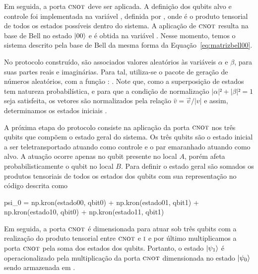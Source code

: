 Em seguida, a porta \(\operatorname{\textsc{cnot}}\) deve ser aplicada. A definição dos qubits alvo e controle foi implementada na variável , definida por , onde  é o produto tensorial de todos os estados possíveis dentro do sistema. A aplicação de \(\operatorname{\textsc{cnot}}\) resulta na base de Bell no estado $\ket{00}$ e é obtida na variável . Nesse momento, temos o sistema descrito pela base de Bell da mesma forma da Equação~\eqref{eq:matrizbell00}.

No protocolo construído, são associados valores aleatórios às variáveis $\alpha$ e $\beta$, para suas partes reais e imaginárias. Para tal, utiliza-se o pacote  de geração de números aleatórios, com a função : . Note que, como a superposição de estados tem natureza probabilística, e para que a condição de normalização $\lvert\alpha\rvert² + \lvert\beta\rvert² = 1$ seja satisfeita, os vetores são normalizados pela relação $\widehat{v} = \vec{v}/\lvert v\rvert$ e assim, determinamos os estados iniciais .

A próxima etapa do protocolo consiste na aplicação da porta \(\operatorname{\textsc{cnot}}\) nos três qubits que compõem o estado geral do sistema. Os três qubits são o estado inicial a ser teletransportado atuando como controle e o par emaranhado atuando como alvo. A atuação ocorre apenas no qubit presente no local \(A\), porém afeta probabilisticamente o qubit no local \(B\). Para definir o estado geral são somados os produtos tensoriais de todos os estados dos qubits com sua representação no código descrita como
\begin{pycode}
  psi_0 = np.kron(estado00, qbit0) + np.kron(estado01, qbit1)
        + np.kron(estado10, qbit0) + np.kron(estado11, qbit1)
\end{pycode}
Em seguida, a porta \(\operatorname{\textsc{cnot}}\) é dimensionada para atuar sob três qubits com a realização do produto tensorial entre \(\operatorname{\textsc{cnot}}\) e \(\operatorname{\textsc{i}}\) e por último multiplicamos a porta \(\operatorname{\textsc{cnot}}\) pela soma dos estados dos qubits. Portanto, o estado $\ket{\psi_1}$ é operacionalizado pela multiplicação da porta \(\operatorname{\textsc{cnot}}\) dimensionada no estado $\ket{\psi_0}$ sendo armazenada em .

